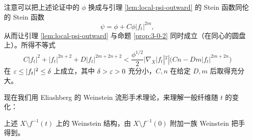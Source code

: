 \begin{remarkx}\label{rem:8}
注意可以把上述论证中的 $\phi$ 换成与引理 \ref{lem:local-psi-outward} 的 Stein 函数同伦的 Stein 函数
\[
  \psi=\phi+C\phi|f_t|^{2m},
\]
从而让引理 \ref{lem:local-psi-outward} 与命题 \ref{prop:3-0-2} 同时成立（在同心的圆盘上）。所得不等式
\[
  C|f_t|^2+|f_t|^{2n+2}+D|f_t|^{2m+2n+2}
  <\frac{\phi^{1/2}}{2}|\nabla_X|f_t|^2|\bigl(Cn-Dm|f_t|^{2m+2n}\bigr)
\]
在 $\varepsilon\le|f_t|^2\le\delta$ 上成立，其中 $\delta>\varepsilon>0$ 充分小，$C,n$ 在给定 $D,m$ 后取得充分大。
\end{remarkx}


现在我们用 Eliashberg 的 Weinstein 流形手术理论，来理解一般纤维随 $t$ 的变化：

\begin{proposition}\label{prop:3-0-3}
  上述 $X\setminus f^{-1}(t)$ 上的 Weinstein 结构，由 $X\setminus f^{-1}(0)$ 附加一族 Weinstein 把手得到。
\end{proposition}

